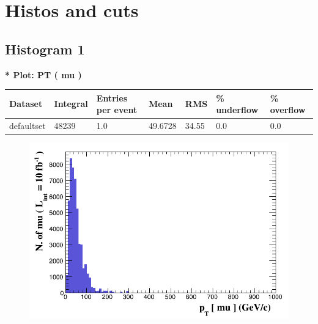 \documentclass[a4paper, 10pt]{article}
\begin{document}
\newpage
\section{ Histos and cuts}

\subsection{ Histogram 1}

\textbf{* Plot: PT ( mu ) }\\
   \begin{table}[H]
  \begin{center}
    \begin{tabular}{|m{23.0mm}|m{23.0mm}|m{18.0mm}|m{19.0mm}|m{19.0mm}|m{19.0mm}|m{19.0mm}|}
      \hline
      {\cellcolor{yellow}         Dataset}& {\cellcolor{yellow}         Integral}& {\cellcolor{yellow}         Entries per event}& {\cellcolor{yellow}         Mean}& {\cellcolor{yellow}         RMS}& {\cellcolor{yellow}         \% underflow}& {\cellcolor{yellow}         \% overflow}\\
      \hline
      {\cellcolor{white}         defaultset}& {\cellcolor{white}         48239}& {\cellcolor{white}         1.0}& {\cellcolor{white}         49.6728}& {\cellcolor{white}         34.55}& {\cellcolor{green}         0.0}& {\cellcolor{green}         0.0}\\
\hline
    \end{tabular}
  \end{center}
\end{table}

\begin{figure}[H]
  \begin{center}
    \includegraphics[scale=0.45]{selection_0.png}\\
\caption{   }
  \end{center}
\end{figure}
      \newpage
\end{document}

